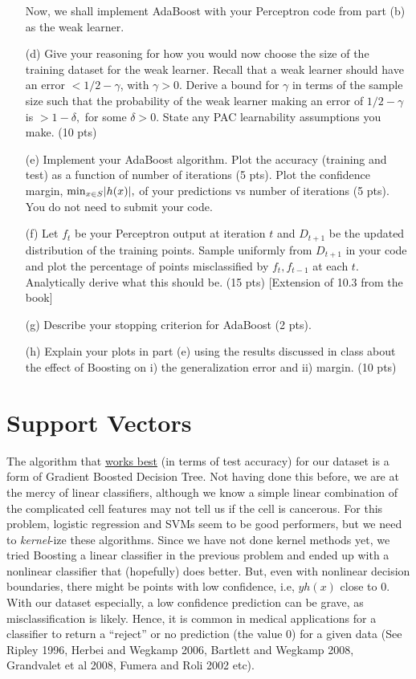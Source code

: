 \documentclass[12pt]{article}
\begin{document}
\begin{itemize}
		Now, we shall implement AdaBoost with your Perceptron code from part (b) as the weak learner. 
	\item[(d)] Give your reasoning for how you would now choose the size of the training dataset for the weak learner. Recall that a weak learner should have an error $< 1/2 - \gamma$, with $\gamma > 0$. Derive a bound for $\gamma$ in terms of the sample size such that the probability of the weak learner making an error of $1/2 - \gamma$ is $> 1- \delta,$ for some $\delta > 0.$ State any PAC learnability assumptions you make. (10 pts)
	\item[(e)] Implement your AdaBoost algorithm. Plot the accuracy (training and test) as a function of number of iterations (5 pts). Plot the confidence margin, ${\rm min}_{x\in S} |h(x)|,$ of your predictions vs number of iterations (5 pts). You do not need to submit your code.
	\item[(f)] Let $f_t$ be your Perceptron output at iteration $t$ and $D_{t+1}$ be the updated distribution of the training points. Sample uniformly from $D_{t+1}$ in your code and plot the percentage of points misclassified by $f_t, f_{t-1}$ at each $t$. Analytically derive what this should be. (15 pts) [Extension of 10.3 from the book]
	\item[(g)] Describe your stopping criterion for AdaBoost (2 pts).
	\item[(h)] Explain your plots in part (e) using the results discussed in class about the effect of Boosting on i) the generalization error and ii) margin.  (10 pts)


\end{itemize}

\section{Support Vectors}

The algorithm that \href{https://archive.ics.uci.edu/dataset/17/breast+cancer+wisconsin+diagnostic}{works best} (in terms of test accuracy) for our dataset is a form of Gradient Boosted Decision Tree. Not having done this before, we are at the mercy of linear classifiers, although we know a simple linear combination of the complicated cell features may not tell us if the cell is cancerous. For this problem, logistic regression and SVMs seem to be good performers, but we need to \emph{kernel}-ize these algorithms. Since we have not done kernel methods yet, we tried Boosting a linear classifier in the previous problem and ended up with a nonlinear classifier that (hopefully) does better.
But, even with nonlinear decision boundaries, there might be points with low confidence, i.e, $y h(x)$ close to 0. With our dataset especially, a low confidence prediction can be grave, as misclassification is likely. Hence, it is common in medical applications for a classifier to return a ``reject'' or no prediction (the value 0) for a given data (See Ripley 1996, Herbei and Wegkamp 2006, Bartlett and Wegkamp 2008, Grandvalet et al 2008, Fumera and Roli 2002 etc). 
\end{document}
